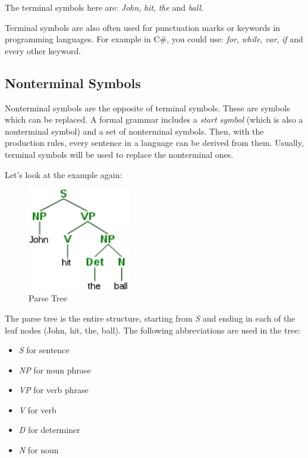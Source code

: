The terminal symbols here are: \textit{John}, \textit{hit}, \textit{the} and \textit{ball}.

Terminal symbols are also often used for punctuation marks or keywords in programming languages. For example in C\#, you could use: \textit{for}, \textit{while}, \textit{var}, \textit{if} and every other keyword.



\subsection{Nonterminal Symbols}
\label{sec:nonterminal-symbols}

Nonterminal symbols are the opposite of terminal symbols. These are symbols which can be replaced. A formal grammar includes a \textit{start symbol} (which is also a nonterminal symbol) and a set of nonterminal symbols. Then, with the production rules, every sentence in a language can be derived from them. Usually, terminal symbols will be used to replace the nonterminal ones. 

Let's look at the example again: 

\begin{figure}[H]
    \centering
        \includegraphics[width=0.4\textwidth]{figures/parse-tree.png}
        \caption{Parse Tree}
\end{figure}

The parse tree is the entire structure, starting from \textit{S} and ending in each of the leaf nodes (John, hit, the, ball). The following abbreviations are used in the tree:

\begin{itemize}
    \item \textit{S} for sentence
    \item \textit{NP} for noun phrase
    \item \textit{VP} for verb phrase
    \item \textit{V} for verb
    \item \textit{D} for determiner
    \item \textit{N} for noun
\end{itemize}

